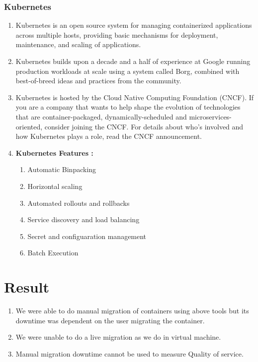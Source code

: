 \documentclass[a4paper,12pt]{article}
\begin{document}
\subsubsection{Kubernetes}
\begin{enumerate}

\item Kubernetes is an open source system for managing containerized applications across multiple hosts, providing basic mechanisms for deployment, maintenance, and scaling of applications. 

\item Kubernetes builds upon a decade and a half of experience at Google running production workloads at scale using a system called Borg, combined with best-of-breed ideas and practices from the community. 

\item Kubernetes is hosted by the Cloud Native Computing Foundation (CNCF). If you are a company that wants to help shape the evolution of technologies that are container-packaged, dynamically-scheduled and microservices-oriented, consider joining the CNCF. For details about who's involved and how Kubernetes plays a role, read the CNCF announcement. \cite{afss}
\item \textbf{Kubernetes Features :}
\begin{enumerate}
\item Automatic Binpacking
  \item Horizontal scaling
  \item Automated rollouts and rollbacks
  \item Service discovery and load balancing
  \item  Secret and configuaration management
  \item Batch Execution
\end{enumerate}

\end{enumerate}

\section{Result}
\begin{enumerate}

\item We were able to do manual migration of containers using above tools but its downtime was dependent on the user migrating the container.
\item We were unable to do a live migration as we do in virtual machine.
\item Manual migration downtime cannot be used to measure Quality of service.
\end{enumerate}


\printbibliography[heading=bibintoc]
\end{document}
